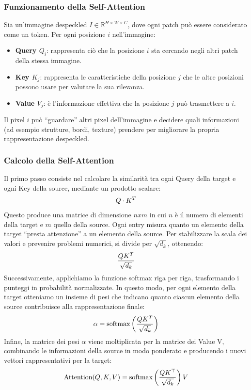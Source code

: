 \subsubsection{Funzionamento della Self-Attention}
Sia un'immagine despeckled \(I \in \mathbb{R}^{H \times W \times C}\), dove ogni patch può essere considerato come un token.  
Per ogni posizione \(i\) nell'immagine:

\begin{itemize}
    \item \textbf{Query \(Q_i\)}: rappresenta ciò che la posizione \(i\) sta cercando negli altri patch della stessa immagine.
    \item \textbf{Key \(K_j\)}: rappresenta le caratteristiche della posizione \(j\) che le altre posizioni possono usare per valutare la sua rilevanza.
    \item \textbf{Value \(V_j\)}: è l'informazione effettiva che la posizione \(j\) può trasmettere a \(i\).
\end{itemize}
Il pixel \(i\) può ``guardare'' altri pixel dell'immagine e decidere quali informazioni (ad esempio strutture, bordi, texture) prendere per migliorare la propria rappresentazione despeckled.

\subsubsection{Calcolo della Self-Attention}
Il primo passo consiste \cite{vaswani2023attentionneed} nel calcolare la similarità tra ogni Query della target e ogni Key della source, mediante un prodotto scalare:
\[
    \makebox[\textwidth][c]{%
      $\displaystyle
        Q \cdot K^T
      $%
    }
\]
Questo produce una matrice di dimensione $nxm$ in cui $n$ è il numero di elementi della target e $m$ 
quello della source. Ogni entry misura quanto un elemento della target “presta attenzione” a un elemento 
della source. Per stabilizzare la scala dei valori e prevenire problemi numerici, si divide per $\sqrt{d_k}$, ottenendo:
\[
    \makebox[\textwidth][c]{%
      $\displaystyle
        \frac{QK^T}{\sqrt{d_k}}
      $%
    }
\]
Successivamente, applichiamo la funzione softmax riga per riga, trasformando i punteggi in probabilità normalizzate. 
In questo modo, per ogni elemento della target otteniamo un insieme di pesi che indicano quanto ciascun elemento della source contribuisce alla rappresentazione finale:
\[
    \makebox[\textwidth][c]{%
      $\displaystyle
        \alpha = \text{softmax}\left(\frac{QK^T}{\sqrt{d_k}}\right)
      $%
    }
\]
Infine, la matrice dei pesi $\alpha$ viene moltiplicata per la matrice dei Value 
V, combinando le informazioni della source in modo ponderato e producendo i nuovi vettori rappresentativi per la target:
\begin{equation}
    \makebox[\textwidth][c]{%
      $\displaystyle
        \text{Attention}(Q, K, V) = \text{softmax}\left(\frac{Q K^\top}{\sqrt{d_k}}\right)V
      $%
    }
    \label{eq:attention}
    \end{equation}
    

